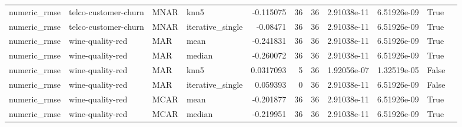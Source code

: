 \begin{table}[ht]
\begin{tabular}{llllrrrrrll}
 numeric\_rmse           & telco-customer-churn & MNAR        & knn5             &     -0.115075    &                  36 &      36 & 2.91038e-11 & 6.51926e-09 & True               &                                                                                                                    \\
 numeric\_rmse           & telco-customer-churn & MNAR        & iterative\_single &     -0.08471     &                  36 &      36 & 2.91038e-11 & 6.51926e-09 & True               &                                                                                                                    \\
 numeric\_rmse           & wine-quality-red     & MAR         & mean             &     -0.241831    &                  36 &      36 & 2.91038e-11 & 6.51926e-09 & True               &                                                                                                                    \\
 numeric\_rmse           & wine-quality-red     & MAR         & median           &     -0.260072    &                  36 &      36 & 2.91038e-11 & 6.51926e-09 & True               &                                                                                                                    \\
 numeric\_rmse           & wine-quality-red     & MAR         & knn5             &      0.0317093   &                   5 &      36 & 1.92056e-07 & 1.32519e-05 & False              &                                                                                                                    \\
 numeric\_rmse           & wine-quality-red     & MAR         & iterative\_single &      0.059393    &                   0 &      36 & 2.91038e-11 & 6.51926e-09 & False              &                                                                                                                    \\
 numeric\_rmse           & wine-quality-red     & MCAR        & mean             &     -0.201877    &                  36 &      36 & 2.91038e-11 & 6.51926e-09 & True               &                                                                                                                    \\
 numeric\_rmse           & wine-quality-red     & MCAR        & median           &     -0.219951    &                  36 &      36 & 2.91038e-11 & 6.51926e-09 & True               &                                                                                                                    \\

\end{tabular}
\end{table}

